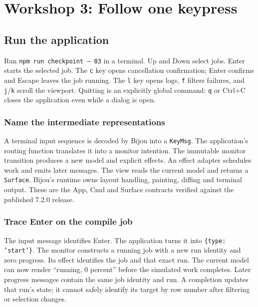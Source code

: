 \chapter{Workshop 3: Follow one keypress}\label{workshop-03}

\section{Run the application}

Run \texttt{npm run checkpoint -- 03} in a terminal. Up and Down select jobs. Enter starts the selected job. The \texttt{c} key opens cancellation confirmation; Enter confirms and Escape leaves the job running. The \texttt{l} key opens logs, \texttt{f} filters failures, and \texttt{j}/\texttt{k} scroll the viewport. Quitting is an explicitly global command: \texttt{q} or Ctrl+C closes the application even while a dialog is open.

\subsection{Name the intermediate representations}

A terminal input sequence is decoded by Bijou into a \texttt{KeyMsg}. The application's routing function translates it into a monitor intention. The immutable monitor transition produces a new model and explicit effects. An effect adapter schedules work and emits later messages. The view reads the current model and returns a \texttt{Surface}. Bijou's runtime owns layout handling, painting, diffing and terminal output. These are the App, Cmd and Surface contracts verified against the published 7.2.0 release.



\subsection{Trace Enter on the compile job}

The input message identifies Enter. The application turns it into \texttt{\{type: 'start'\}}. The monitor constructs a running job with a new run identity and zero progress. Its effect identifies the job and that exact run. The current model can now render ``running, 0 percent'' before the simulated work completes. Later progress messages contain the same job identity and run. A completion updates that run's state; it cannot safely identify its target by row number after filtering or selection changes.

